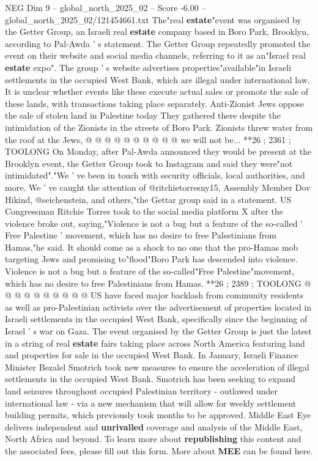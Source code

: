\begin{textsample}{NEG Dim 9 – global\_north\_2025\_02 – Score -6.00 – global\_north\_2025\_02/121454661.txt}
The"real \textbf{estate}"event was organised by the Getter Group, an Israeli real \textbf{estate} company based in Boro Park, Brooklyn, according to Pal-Awda ' s statement.
The Getter Group repeatedly promoted the event on their website and social media channels, referring to it as an"Israel real \textbf{estate} expo".
The group ' s website advertises properties"available"in Israeli settlements in the occupied West Bank, which are illegal under international law.
It is unclear whether events like these execute actual sales or promote the sale of these lands, with transactions taking place separately.
Anti-Zionist Jews oppose the sale of stolen land in Palestine today They gathered there despite the intimidation of the Zionists in the streets of Boro Park.
Zionists threw water from the roof at the Jews, @ @ @ @ @ @ @ @ @ @ we will not be... **26 ; 2361 ; TOOLONG On Monday, after Pal-Awda announced they would be present at the Brooklyn event, the Getter Group took to Instagram and said they were"not intimidated"."We ' ve been in touch with security officials, local authorities, and more.
We ' ve caught the attention of @ritchietorresny15, Assembly Member Dov Hikind, @seichenstein, and others,"the Gettar group said in a statement.
US Congressman Ritchie Torres took to the social media platform X after the violence broke out, saying,"Violence is not a bug but a feature of the so-called ' Free Palestine ' movement, which has no desire to free Palestinians from Hamas,"he said.
It should come as a shock to no one that the pro-Hamas mob targeting Jews and promising to"flood"Boro Park has descended into violence.
Violence is not a bug but a feature of the so-called"Free Palestine"movement, which has no desire to free Palestinians from Hamas. **26 ; 2389 ; TOOLONG @ @ @ @ @ @ @ @ @ @ US have faced major backlash from community residents as well as pro-Palestinian activists over the advertisement of properties located in Israeli settlements in the occupied West Bank, specifically since the beginning of Israel ' s war on Gaza.
The event organised by the Getter Group is just the latest in a string of real \textbf{estate} fairs taking place across North America featuring land and properties for sale in the occupied West Bank.
In January, Israeli Finance Minister Bezalel Smotrich took new measures to ensure the acceleration of illegal settlements in the occupied West Bank.
Smotrich has been seeking to expand land seizures throughout occupied Palestinian territory - outlawed under international law - via a new mechanism that will allow for weekly settlement building permits, which previously took months to be approved.
Middle East Eye delivers independent and \textbf{unrivalled} coverage and analysis of the Middle East, North Africa and beyond.
To learn more about \textbf{republishing} this content and the associated fees, please fill out this form.
More about \textbf{MEE} can be found here.

\end{textsample}
